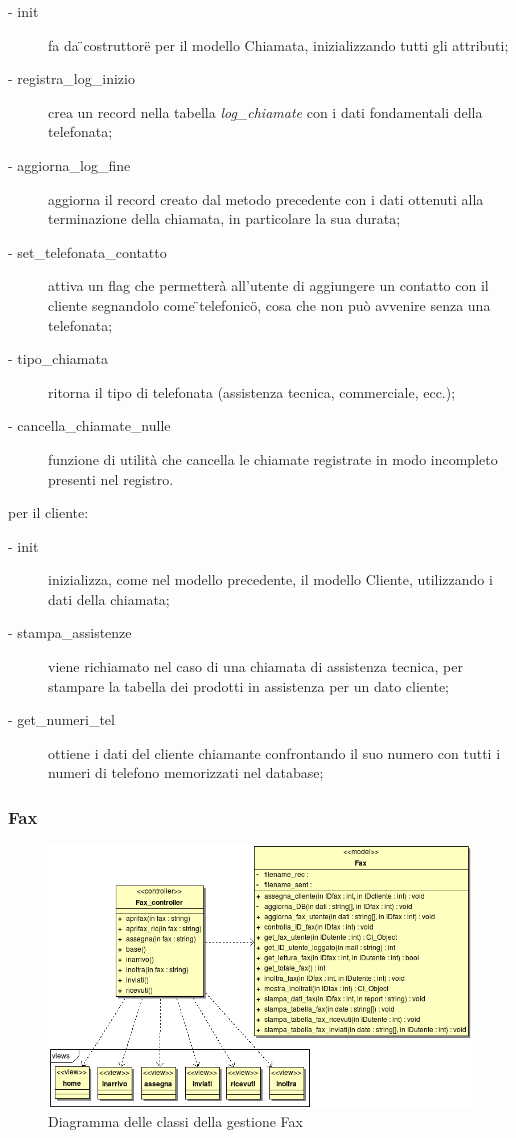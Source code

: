 \begin{description}
\item[- init] fa da \"{}costruttore\"{} per il modello Chiamata, inizializzando tutti gli attributi;
\item[- registra\_{}log\_{}inizio] crea un record nella tabella \textit{log\_{}chiamate} con i dati fondamentali della telefonata;
\item[- aggiorna\_{}log\_{}fine] aggiorna il record creato dal metodo precedente con i dati ottenuti alla terminazione della chiamata, in particolare la sua durata;
\item[- set\_{}telefonata\_{}contatto] attiva un flag che permetter\`a all'utente di aggiungere un contatto con il cliente segnandolo come \"{}telefonico\"{}, cosa che non pu\`o avvenire senza una telefonata;
\item[- tipo\_{}chiamata] ritorna il tipo di telefonata (assistenza tecnica, commerciale, ecc.);
\item[- cancella\_{}chiamate\_{}nulle] funzione di utilit\`a che cancella le chiamate registrate in modo incompleto presenti nel registro.
 \end{description}

per il cliente:
\begin{description}
\item[- init] inizializza, come nel modello precedente, il modello Cliente, utilizzando i dati della chiamata;
\item[- stampa\_{}assistenze] viene richiamato nel caso di una chiamata di assistenza tecnica, per stampare la tabella dei prodotti in assistenza per un dato cliente;
\item[- get\_{}numeri\_{}tel] ottiene i dati del cliente chiamante confrontando il suo numero con tutti i numeri di telefono memorizzati nel database;
 \end{description}

\newpage
\subsubsection{Fax}
\begin{figure}[!ht]
\centering
  \includegraphics[scale=0.8]{./images/FaxMVC.png}
\caption{Diagramma delle classi della gestione Fax}
\label{fax}
\end{figure}

